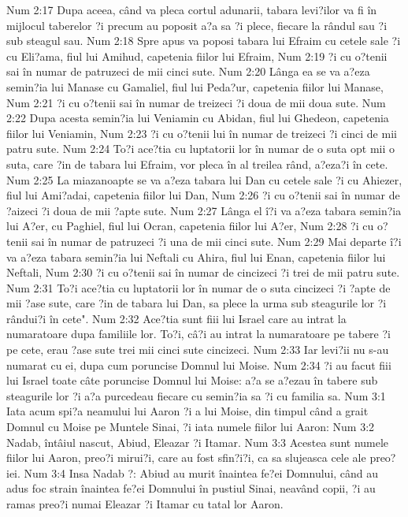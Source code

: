 Num 2:17  Dupa aceea, când va pleca cortul adunarii, tabara levi?ilor va fi în mijlocul taberelor ?i precum au poposit a?a sa ?i plece, fiecare la rândul sau ?i sub steagul sau.
Num 2:18  Spre apus va poposi tabara lui Efraim cu cetele sale ?i cu Eli?ama, fiul lui Amihud, capetenia fiilor lui Efraim,
Num 2:19  ?i cu o?tenii sai în numar de patruzeci de mii cinci sute.
Num 2:20  Lânga ea se va a?eza semin?ia lui Manase cu Gamaliel, fiul lui Peda?ur, capetenia fiilor lui Manase,
Num 2:21  ?i cu o?tenii sai în numar de treizeci ?i doua de mii doua sute.
Num 2:22  Dupa acesta semin?ia lui Veniamin cu Abidan, fiul lui Ghedeon, capetenia fiilor lui Veniamin,
Num 2:23  ?i cu o?tenii lui în numar de treizeci ?i cinci de mii patru sute.
Num 2:24  To?i ace?tia cu luptatorii lor în numar de o suta opt mii o suta, care ?in de tabara lui Efraim, vor pleca în al treilea rând, a?eza?i în cete.
Num 2:25  La miazanoapte se va a?eza tabara lui Dan cu cetele sale ?i cu Ahiezer, fiul lui Ami?adai, capetenia fiilor lui Dan,
Num 2:26  ?i cu o?tenii sai în numar de ?aizeci ?i doua de mii ?apte sute.
Num 2:27  Lânga el î?i va a?eza tabara semin?ia lui A?er, cu Paghiel, fiul lui Ocran, capetenia fiilor lui A?er,
Num 2:28  ?i cu o?tenii sai în numar de patruzeci ?i una de mii cinci sute.
Num 2:29  Mai departe î?i va a?eza tabara semin?ia lui Neftali cu Ahira, fiul lui Enan, capetenia fiilor lui Neftali,
Num 2:30  ?i cu o?tenii sai în numar de cincizeci ?i trei de mii patru sute.
Num 2:31  To?i ace?tia cu luptatorii lor în numar de o suta cincizeci ?i ?apte de mii ?ase sute, care ?in de tabara lui Dan, sa plece la urma sub steagurile lor ?i rândui?i în cete".
Num 2:32  Ace?tia sunt fiii lui Israel care au intrat la numaratoare dupa familiile lor. To?i, câ?i au intrat la numaratoare pe tabere ?i pe cete, erau ?ase sute trei mii cinci sute cincizeci.
Num 2:33  Iar levi?ii nu s-au numarat cu ei, dupa cum poruncise Domnul lui Moise.
Num 2:34  ?i au facut fiii lui Israel toate câte poruncise Domnul lui Moise: a?a se a?ezau în tabere sub steagurile lor ?i a?a purcedeau fiecare cu semin?ia sa ?i cu familia sa.
Num 3:1  Iata acum spi?a neamului lui Aaron ?i a lui Moise, din timpul când a grait Domnul cu Moise pe Muntele Sinai, ?i iata numele fiilor lui Aaron:
Num 3:2  Nadab, întâiul nascut, Abiud, Eleazar ?i Itamar.
Num 3:3  Acestea sunt numele fiilor lui Aaron, preo?i mirui?i, care au fost sfin?i?i, ca sa slujeasca cele ale preo?iei.
Num 3:4  Insa Nadab ?: Abiud au murit înaintea fe?ei Domnului, când au adus foc strain înaintea fe?ei Domnului în pustiul Sinai, neavând copii, ?i au ramas preo?i numai Eleazar ?i Itamar cu tatal lor Aaron.
